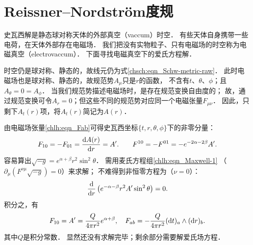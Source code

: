 \section{Reissner--Nordstr\"om度规}
史瓦西解是静态球对称天体的外部真空（vaccum）时空．
有些天体自身携带一些电荷，在天体外部存在电磁场．
我们把没有实物粒子、只有电磁场的时空称为{\heiti 电磁真空}（electrovaccum）．
下面寻找电磁真空下的爱氏方程解．

时空仍是球对称、静态的，故线元仍为式\eqref{chsch:eqn_Schw-metric-raw}．
此时电磁场也是球对称、静态的，故规范势$A_\mu$只是$r$的函数，
不含有$t$、$\theta$、$\phi$；且$A_\theta=0=A_\phi$．
当我们规范势描述电磁场时，是存在规范变换自由度的；
故，通过规范变换可令$A_r=0$；但这些不同的规范势对应同一个电磁张量$F_{\mu\nu}$．
因此，只剩下$A_t(r)$项，将$A_t(r)$简记为$A(r)$．

由电磁场张量\eqref{chlh:eqn_Fab}可得史瓦西坐标$\{t,r,\theta,\phi\}$下的非零分量：
\begin{equation}
    F_{10}=-F_{01}= \frac{{\rm d}A(r)}{{\rm d}r} = A' . \qquad
    F^{10}=-F^{01}=-e^{-2\alpha-2\beta}A' .
\end{equation}
容易算出$\sqrt{-g}=e^{\alpha+\beta}r^2 \sin^2\theta$．
需用麦氏方程组\eqref{chlh:eqn_Maxwell-1}
（$\partial_\mu \left(F^{\nu\mu} \sqrt{-g} \right) = 0$）来求解；
不难得到非恒零方程为（$\nu=0$）：
\begin{equation}
    \frac{{\rm d}}{{\rm d}r} \left( e^{-\alpha-\beta} r^2 A' \sin^2\theta \right) =0.
\end{equation}
积分之，有
\begin{equation}
    F_{10}= A' = \frac{Q}{4\pi r^2} e^{\alpha+\beta},\quad
    F_{ab}=-\frac{Q}{4\pi r^2} ({\rm d}t)_a \wedge ({\rm d} r)_b .
\end{equation}
其中$Q$是积分常数．
显然还没有求解完毕；剩余部分需要解爱氏场方程．

